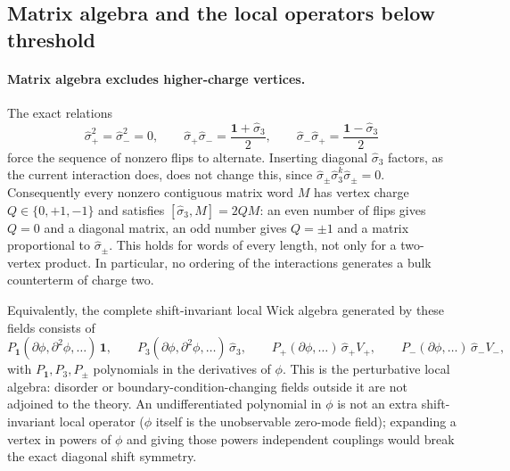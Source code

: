 \subsection{Matrix algebra and the local operators below threshold}\label{sri:app:clos:classification}
\paragraph{Matrix algebra excludes higher-charge vertices.} The exact relations
\begin{equation}
 \hat\sigma_+^2=\hat\sigma_-^2=0,\qquad
 \hat\sigma_+\hat\sigma_-=\frac{\mathbf 1+\hat\sigma_3}{2},\qquad
 \hat\sigma_-\hat\sigma_+=\frac{\mathbf 1-\hat\sigma_3}{2}
\end{equation}
force the sequence of nonzero flips to alternate. Inserting diagonal $\hat\sigma_3$ factors, as the current
interaction does, does not change this, since $\hat\sigma_\pm\hat\sigma_3^k\hat\sigma_\pm=0$. Consequently every
nonzero contiguous matrix word $M$ has vertex charge $Q\in\{0,+1,-1\}$ and satisfies $[\hat\sigma_3,M]=2QM$: an even
number of flips gives $Q=0$ and a diagonal matrix, an odd number gives $Q=\pm1$ and a matrix proportional to
$\hat\sigma_\pm$. This holds for words of every length, not only for a two-vertex product. In particular, no ordering
of the interactions generates a bulk counterterm of charge two.

Equivalently, the complete shift-invariant local Wick algebra generated by these fields consists of
\begin{equation}
 P_{\mathbf 1}(\partial\phi,\partial^2\phi,\ldots)\,\mathbf 1,\qquad
 P_3(\partial\phi,\partial^2\phi,\ldots)\,\hat\sigma_3,\qquad
 P_+(\partial\phi,\ldots)\,\hat\sigma_+V_+,\qquad
 P_-(\partial\phi,\ldots)\,\hat\sigma_-V_-,
 \label{sri:eq:clos:algebra}
\end{equation}
with $P_{\mathbf 1},P_3,P_\pm$ polynomials in the derivatives of $\phi$. This is the perturbative local algebra:
disorder or boundary-condition-changing fields outside it are not adjoined to the theory. An undifferentiated
polynomial in $\phi$ is not an extra shift-invariant local operator ($\phi$ itself is the unobservable zero-mode
field); expanding a vertex in powers of $\phi$ and giving those powers independent couplings would break the exact
diagonal shift symmetry.

